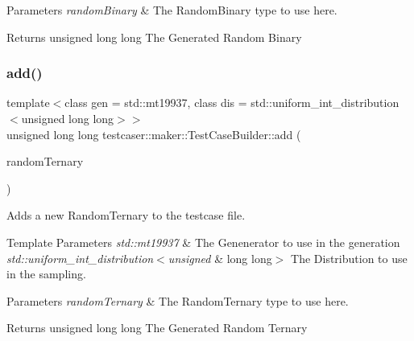 \begin{DoxyParams}{Parameters}
{\em random\+Binary} & The Random\+Binary type to use here. \\
\hline
\end{DoxyParams}
\begin{DoxyReturn}{Returns}
unsigned long long The Generated Random Binary 
\end{DoxyReturn}
\mbox{\label{classtestcaser_1_1maker_1_1TestCaseBuilder_a4bab625f6da4431125ca3e9eb602eaad}} 
\subsubsection{\texorpdfstring{add()}{add()}\hspace{0.1cm}{\footnotesize\ttfamily [6/11]}}
{\footnotesize\ttfamily template$<$class gen  = std\+::mt19937, class dis  = std\+::uniform\+\_\+int\+\_\+distribution$<$unsigned long long$>$$>$ \\
unsigned long long testcaser\+::maker\+::\+Test\+Case\+Builder\+::add (\begin{DoxyParamCaption}\item[{\mbox{\hyperlink{structtestcaser_1_1maker_1_1types_1_1RandomTernary}{types\+::\+Random\+Ternary}}$<$ gen, dis $>$ \&}]{random\+Ternary }\end{DoxyParamCaption})\hspace{0.3cm}{\ttfamily [inline]}}



Adds a new Random\+Ternary to the testcase file. 


\begin{DoxyTemplParams}{Template Parameters}
{\em std\+::mt19937} & The Genenerator to use in the generation \\
\hline
{\em std\+::uniform\+\_\+int\+\_\+distribution$<$unsigned} & long long$>$ The Distribution to use in the sampling. \\
\hline
\end{DoxyTemplParams}

\begin{DoxyParams}{Parameters}
{\em random\+Ternary} & The Random\+Ternary type to use here. \\
\hline
\end{DoxyParams}
\begin{DoxyReturn}{Returns}
unsigned long long The Generated Random Ternary 
\end{DoxyReturn}
\mbox{\label{classtestcaser_1_1maker_1_1TestCaseBuilder_adcb4d6cfafbf67234818b0b68c586ad4}} 
